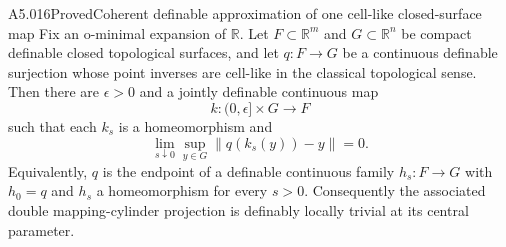 \begin{saresult}{A5.016}{Proved}{Coherent definable approximation of one cell-like closed-surface map}
Fix an o-minimal expansion of $\mathbb R$. Let $F\subset\mathbb R^m$ and
$G\subset\mathbb R^n$ be compact definable closed topological surfaces,
and let $q:F\to G$ be a continuous definable surjection whose point inverses
are cell-like in the classical topological sense. Then there are
$\epsilon>0$ and a jointly definable continuous map
\[
 k:(0,\epsilon]\times G\longrightarrow F
\]
such that each $k_s$ is a homeomorphism and
\[
 \lim_{s\downarrow0}\sup_{y\in G}\|q(k_s(y))-y\|=0.
 \tag{A5.16.4}
\]
Equivalently, $q$ is the endpoint of a definable continuous family
$h_s:F\to G$ with $h_0=q$ and $h_s$ a homeomorphism for every $s>0$.
Consequently the associated double mapping-cylinder projection is definably
locally trivial at its central parameter.

\end{saresult}
